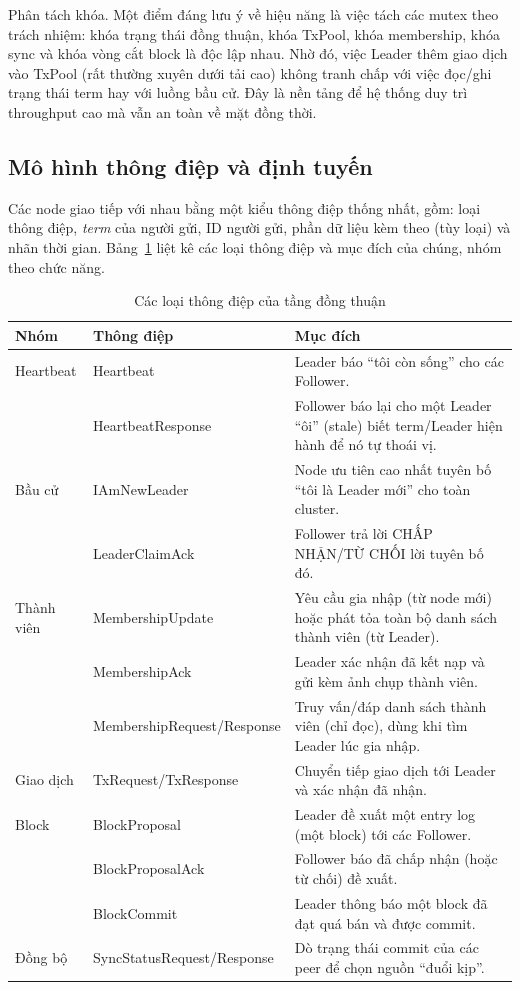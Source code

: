 Phân tách khóa. Một điểm đáng lưu ý về hiệu năng là việc tách các mutex
theo trách nhiệm: khóa trạng thái đồng thuận, khóa TxPool, khóa membership, khóa
sync và khóa vòng cắt block là độc lập nhau. Nhờ đó, việc Leader thêm giao dịch
vào TxPool (rất thường xuyên dưới tải cao) không tranh chấp với việc đọc/ghi trạng
thái term hay với luồng bầu cử. Đây là nền tảng để hệ thống duy trì throughput cao
mà vẫn an toàn về mặt đồng thời.

\subsection{Mô hình thông điệp và định tuyến}
\label{sec:ordering-messages}

Các node giao tiếp với nhau bằng một kiểu thông điệp thống nhất, gồm: loại thông
điệp, \textit{term} của người gửi, ID người gửi, phần dữ liệu kèm theo (tùy loại)
và nhãn thời gian. Bảng~\ref{tab:raft-messages} liệt kê các loại thông điệp và
mục đích của chúng, nhóm theo chức năng.

\begin{table}[H]
\centering
\caption{Các loại thông điệp của tầng đồng thuận}
\label{tab:raft-messages}
\begin{tabular}{@{}p{2.2cm}p{4.3cm}p{6.3cm}@{}}
\toprule
\textbf{Nhóm} & \textbf{Thông điệp} & \textbf{Mục đích} \\
\midrule
Heartbeat & Heartbeat & Leader báo ``tôi còn sống'' cho các Follower. \\
          & HeartbeatResponse & Follower báo lại cho một Leader ``ôi'' (stale) biết term/Leader hiện hành để nó tự thoái vị. \\
\midrule
Bầu cử & IAmNewLeader & Node ưu tiên cao nhất tuyên bố ``tôi là Leader mới'' cho toàn cluster. \\
       & LeaderClaimAck & Follower trả lời CHẤP NHẬN/TỪ CHỐI lời tuyên bố đó. \\
\midrule
Thành viên & MembershipUpdate & Yêu cầu gia nhập (từ node mới) hoặc phát tỏa toàn bộ danh sách thành viên (từ Leader). \\
           & MembershipAck & Leader xác nhận đã kết nạp và gửi kèm ảnh chụp thành viên. \\
           & MembershipRequest/Response & Truy vấn/đáp danh sách thành viên (chỉ đọc), dùng khi tìm Leader lúc gia nhập. \\
\midrule
Giao dịch & TxRequest/TxResponse & Chuyển tiếp giao dịch tới Leader và xác nhận đã nhận. \\
\midrule
Block & BlockProposal & Leader đề xuất một entry log (một block) tới các Follower. \\
      & BlockProposalAck & Follower báo đã chấp nhận (hoặc từ chối) đề xuất. \\
      & BlockCommit & Leader thông báo một block đã đạt quá bán và được commit. \\
\midrule
Đồng bộ & SyncStatusRequest/Response & Dò trạng thái commit của các peer để chọn nguồn ``đuổi kịp''. \\
\bottomrule
\end{tabular}
\end{table}

